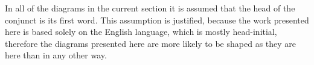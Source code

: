 \begin{exe}
    \ex\label{ex:diagram}
\end{exe}

\newlength{\treeheight}
\newlength{\treewidth}

In all of the diagrams in the current section it is assumed that the head of the conjunct is its first word. This assumption is justified, because the work presented here is based solely on the English language, which is mostly head-initial, therefore the diagrams presented here are more likely to be shaped as they are here than in any other way.






